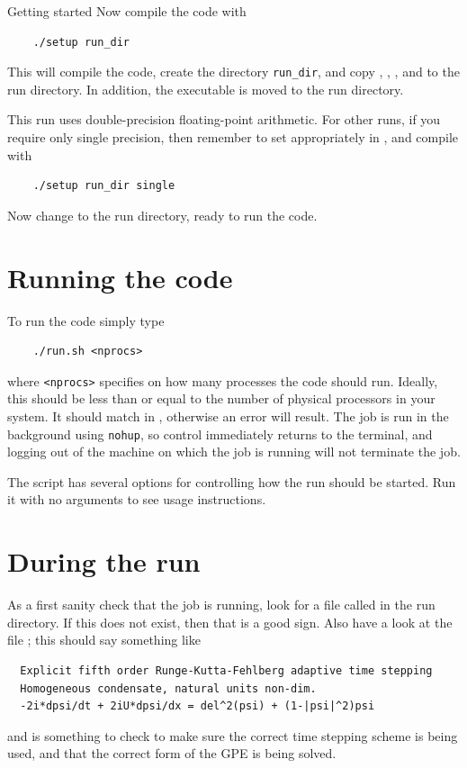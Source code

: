 \begin{chapter}{\label{cha:quickstart}Getting started}
  Now compile the code with
  \begin{Verbatim}
    ./setup run_dir
  \end{Verbatim}
  This will compile the code, create the directory \verb"run_dir", and copy
  , , , and
   to the run directory.  In addition, the executable
   is moved to the run directory.

  This run uses double-precision floating-point arithmetic.  For other runs, if
  you require only single precision, then remember to set 
  appropriately in , and compile with
  \begin{Verbatim}
    ./setup run_dir single
  \end{Verbatim}
  Now change to the run directory, ready to run the code.

  \section{Running the code}
  To run the code simply type
  \begin{Verbatim}
    ./run.sh <nprocs>
  \end{Verbatim}
  where \verb"<nprocs>" specifies on how many processes the code should run.
  Ideally, this should be less than or equal to the number of physical
  processors in your system.  It should match  in
  , otherwise an error will result.  The job is run in
  the background using \verb"nohup", so control immediately returns to the
  terminal, and logging out of the machine on which the job is running will not
  terminate the job.

  The  script has several options for controlling how the run
  should be started.  Run it with no arguments to see usage instructions.

  \section{During the run}
  As a first sanity check that the job is running, look for a file called
   in the run directory.  If this does not exist, then that is a
  good sign.  Also have a look at the file ; this should say
  something like
  \begin{Verbatim}
  Explicit fifth order Runge-Kutta-Fehlberg adaptive time stepping
  Homogeneous condensate, natural units non-dim.
  -2i*dpsi/dt + 2iU*dpsi/dx = del^2(psi) + (1-|psi|^2)psi
  \end{Verbatim}
  and is something to check to make sure the correct time stepping scheme is
  being used, and that the correct form of the GPE is being solved.


\end{chapter}
